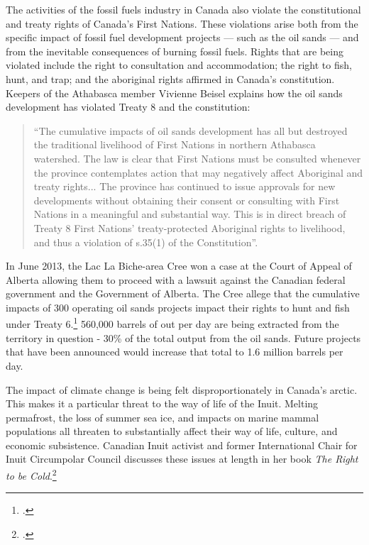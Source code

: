 The activities of the fossil fuels industry in Canada also violate the constitutional and treaty rights of Canada's First Nations.
These violations arise both from the specific impact of fossil fuel development projects --- such as the oil sands --- and from the inevitable consequences of burning fossil fuels.
Rights that are being violated include the right to consultation and accommodation; the right to fish, hunt, and trap; and the aboriginal rights affirmed in Canada's constitution.
Keepers of the Athabasca member Vivienne Beisel explains how the oil sands development has violated Treaty 8 and the constitution:
\begin{quote}
``The cumulative impacts of oil sands development has all but destroyed the traditional livelihood of First Nations in northern Athabasca watershed.  The law is clear that First Nations must be consulted whenever the province contemplates action that may negatively affect Aboriginal and treaty rights... The province has continued to issue approvals for new developments without obtaining their consent or consulting with First Nations in a meaningful and substantial way. This is in direct breach of Treaty 8 First Nations' treaty-protected Aboriginal rights to livelihood, and thus a violation of s.35(1) of the Constitution''.
\end{quote}
In June 2013, the Lac La Biche-area Cree won a case at the Court of Appeal of Alberta allowing them to proceed with a lawsuit against the Canadian federal government and the Government of Alberta.
The Cree allege that the cumulative impacts of 300 operating oil sands projects impact their rights to hunt and fish under Treaty 6.\footcite[][]{BandWinsTreatyRights}
560,000 barrels of out per day are being extracted from the territory in question - 30\% of the total output from the oil sands.
Future projects that have been announced would increase that total to 1.6 million barrels per day.



The impact of climate change is being felt disproportionately in Canada's arctic.
This makes it a particular threat to the way of life of the Inuit.
Melting permafrost, the loss of summer sea ice, and impacts on marine mammal populations all threaten to substantially affect their way of life, culture, and economic subsistence.
Canadian Inuit activist and former International Chair for Inuit Circumpolar Council discusses these issues at length in her book \emph{The Right to be Cold}.\footcite[][]{RightToBeCold}



